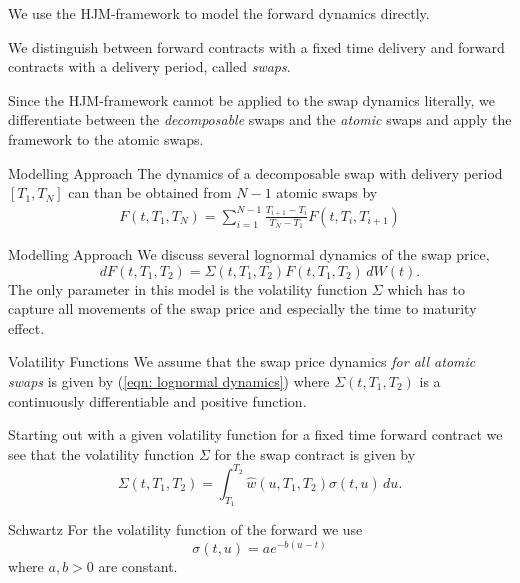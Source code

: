 



	We use the HJM-framework to model the forward dynamics directly.


	We distinguish between forward contracts with a fixed time delivery and forward contracts with a delivery period, called \emph{swaps}.


	Since the HJM-framework cannot be applied to the swap dynamics literally, we differentiate between the \emph{decomposable} swaps and the \emph{atomic} swaps and apply the framework to the atomic swaps.





{Modelling Approach}
The dynamics of a decomposable swap with delivery period $[T_1,T_{N}]$ can than be obtained from $N-1$ atomic swaps by
\begin{align}
F(t,T_1,T_N)=\sum\limits_{i=1}^{N-1} \frac{T_{i+1}-T_i}{T_N-T_1} F(t,T_i,T_{i+1})\label{eqn: decomposbale swap}
\end{align}

{Modelling Approach}
We discuss several lognormal dynamics of the swap price,
\begin{equation}
dF(t,T_1,T_2)=\Sigma(t,T_1,T_2)F(t,T_1,T_2)\, dW(t). \label{eqn: lognormal dynamics}
\end{equation}
The only parameter in this model is the volatility function $\Sigma$ which has to capture all movements of the swap price and especially the time to maturity effect.

{Volatility Functions}
We assume that the swap price dynamics \emph{for all atomic swaps} is given by (\ref{eqn: lognormal dynamics})
where $\Sigma(t,T_1,T_2)$ is a continuously differentiable and positive function.

Starting out with a given volatility function for a fixed time forward contract we see that the volatility function $\Sigma$ for the swap contract is given by
\begin{equation}
\Sigma(t,T_1,T_2)=\int_{T_1}^{T_2} \hat{w}(u,T_1,T_2) \sigma(t,u) \, du. \label{eqn: swap volatility creation}
\end{equation}

{Schwartz}
For the volatility function of the forward we use
\begin{equation}\label{vol-schwartz}
\sigma(t,u)=a e^{-b(u-t)}
\end{equation}
where $a,b >0 $ are constant.

